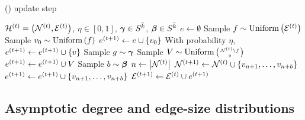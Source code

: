 \begin{algorithm}[!ht]
    \caption{\Model (\model) update step}\label{alg:model}
    \begin{algorithmic}
    \Require $\mathcal{H}^{(t)} = \left(\mathcal{N}^{(t)}, \mathcal{E}^{(t)}\right)$, $\eta \in [0,1]$, $\boldsymbol{\gamma} \in S^{\bar{k}}$, $\boldsymbol{\beta} \in S^{\bar{k}}$
    \State $e \gets \emptyset$
    \State Sample $f \sim \mathrm{Uniform}\left(\mathcal{E}^{(t)}\right)$ 
    \State Sample $v_0 \sim \mathrm{Uniform}\left(f\right)$ 
    \State $e^{(t+1)} \gets e\cup \left\{v_0\right\}$ 
    \State With probability $\eta$, $e^{(t+1)} \gets e^{(t+1)} \cup \left\{v\right\}$   
    \EndFor
    \State Sample $g \sim \boldsymbol{\gamma}$ 
    \State Sample $V \sim \mathrm{Uniform}\paren{\genfrac{}{}{0pt}{2}{\at{\nodeset}{t}\setminus f}{g}}$ 
    \State $e^{(t+1)} \gets e^{(t+1)} \cup V$
    \State Sample $b \sim \boldsymbol{\beta}$  
    \State $n \gets \left\lvert \mathcal{N}^{(t)} \right\rvert$
    \State $\mathcal{N}^{(t+1)} \gets \mathcal{N}^{(t)} \cup \left\{v_{n+1}, \ldots, v_{n+b}\right\}$ 
    \State $e^{(t+1)} \gets e^{(t+1)} \cup \left\{v_{n+1}, \ldots, v_{n+b}\right\}$
    \State $\mathcal{E}^{(t+1)} \gets \mathcal{E}^{(t)} \cup e^{(t+1)}$
    \State {}
    \end{algorithmic}
\end{algorithm}



\subsection*{Asymptotic degree and edge-size distributions} 



